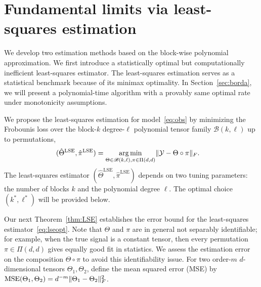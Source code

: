 \documentclass[12pt]{article}
\theoremstyle{definition}
\def\caliB{\mathscr{B}}
\begin{document}
\section{Fundamental limits via least-squares estimation}\label{sec:lse}
We develop two estimation methods based on the block-wise polynomial approximation. We first introduce a statistically optimal but computationally inefficient least-squares estimator. The least-squares estimation serves as a statistical benchmark because of its minimax optimality. In Section~\ref{sec:borda}, we will present a polynomial-time algorithm with a provably same optimal rate under monotonicity assumptions.

We propose the least-squares estimation for model~\eqref{eq:obs} by minimizing the Frobounis loss over the block-$k$ degree-$\ell$ polynomial tensor family $\caliB(k,\ell)$ up to permutations, 
\begin{align}\label{eq:lseopt}
    (\hat\Theta^{\text{LSE}},\hat \pi^{\text{LSE}}) &= \argmin_{\Theta\in\caliB(k,\ell), \pi\in \Pi(d,d)}\FnormSize{}{\tY-\Theta\circ\pi}.
\end{align}
The least-squares estimator $(\hat\Theta^{\text{LSE}},\hat\pi^{\text{LSE}})$ depends on two tuning parameters: the number of blocks $k$ and the polynomial degree $\ell$. The optimal choice $(k^*,\ell^*)$ will be provided below. 

Our next Theorem~\ref{thm:LSE} establishes the error bound for the least-squares estimator~\eqref{eq:lseopt}. Note that $\Theta$ and $\pi$ are in general not separably identifiable; for example, when the true signal is a constant tensor, then every permutation $\pi\in \Pi(d,d)$ gives equally good fit in statistics. We assess the estimation error on the composition $\Theta \circ \pi$ to avoid this identifiability issue. For two order-$m$ $d$-dimensional tensors $\Theta_1, \Theta_2$, define the mean squared error (MSE) by $\textup{MSE}(\Theta_1,\Theta_2) = d^{-m}\lVert\Theta_1-\Theta_2\rVert_F^2$. 
 
\end{document}
